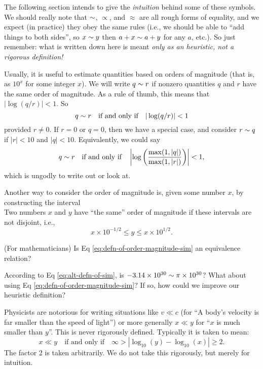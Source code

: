 \begin{ddanger}
The following section intends to give the \emph{intuition} behind some
of these symbols. We should really note that $\sim$, $\propto$, and
$\approx$ are all rough forms of equality, and we expect (in practice)
they obey the same rules (i.e., we should be able to ``add things to
both sides'', so $x\sim y$ then $a+x\sim a+y$ for any $a$, etc.). So
just remember: what is written down here is meant
\emph{only as an heuristic, not a rigorous definition!}
\end{ddanger}

Usually, it is useful to estimate quantities based on orders of
magnitude (that is, as $10^{x}$ for some integer $x$). We will write
$q\sim r$ if nonzero quantities $q$ and $r$ have the same order of
magnitude. As a rule of thumb, this means that $|\log(q/r)|< 1$. So
\begin{equation}\label{eq:defn-of-order-magnitude-sim}
q\sim r\quad\mbox{if and only if}\quad |\log(q/r)|< 1
\end{equation}
provided $r\neq0$. If $r=0$ or $q=0$, then we have a special case, and
consider $r\sim q$ if $|r|<10$ and $|q|<10$. Equivalently, we could say
\begin{equation}\label{eq:alt-defn-of-sim}
q\sim r\quad\mbox{if and only if}\quad \left|\log\left(\frac{\max(1,
|q|)}{\max(1, |r|)}\right)\right| < 1,
\end{equation}
which is ungodly to write out or look at.

Another way to consider the order of magnitude is, given some number
$x$, by constructing the interval
\begin{equation}
[x\times 10^{-1/2}, x\times 10^{1/2}]
\end{equation}
Two numbers $x$ and $y$ have ``the same'' order of magnitude if these
intervals are not disjoint, i.e.,
\begin{equation}
x\times 10^{-1/2}\leq y\leq x\times 10^{1/2}.
\end{equation}

 (For mathematicians) Is Eq \eqref{eq:defn-of-order-magnitude-sim}
an equivalence relation?

 According to Eq \eqref{eq:alt-defn-of-sim}, is
$-3.14\times10^{30}\sim\pi\times10^{30}$? What about using Eq \eqref{eq:defn-of-order-magnitude-sim}?
If so, how could we improve our heuristic definition?

Physicists are notorious for writing situations like $v\ll c$ (for ``A
body's velocity is far smaller than the speed of light'') or more
generally $x\ll y$ for ``$x$ is much smaller than $y$''. This is never
rigorously defined. Typically it is taken to mean:
\begin{equation}
x\ll y\quad\mbox{if and only if}\quad \infty>|\log_{10}(y)-\log_{10}(x)|\geq2.
\end{equation}
The factor 2 is taken arbitrarily. We do not take this rigorously, but
merely for intuition.

